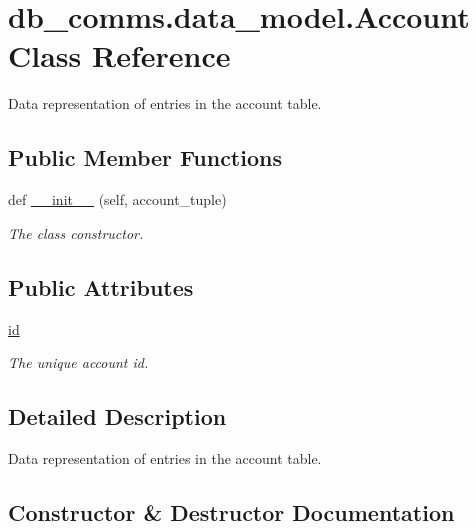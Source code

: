 \hypertarget{classdb__comms_1_1data__model_1_1_account}{}\section{db\+\_\+comms.\+data\+\_\+model.\+Account Class Reference}
\label{classdb__comms_1_1data__model_1_1_account}


Data representation of entries in the account table.  


\subsection*{Public Member Functions}
\begin{DoxyCompactItemize}
\item 
def \hyperlink{classdb__comms_1_1data__model_1_1_account_a88796d19e1a6dad4f41867b6e02b3d8f}{\+\_\+\+\_\+init\+\_\+\+\_\+} (self, account\+\_\+tuple)
\begin{DoxyCompactList}\small\item\em The class constructor. \end{DoxyCompactList}\end{DoxyCompactItemize}
\subsection*{Public Attributes}
\begin{DoxyCompactItemize}
\item 
\hyperlink{classdb__comms_1_1data__model_1_1_account_a37ba55b07a64536efe9bf4283b90da92}{id}
\begin{DoxyCompactList}\small\item\em The unique account id. \end{DoxyCompactList}\end{DoxyCompactItemize}


\subsection{Detailed Description}
Data representation of entries in the account table. 



\subsection{Constructor \& Destructor Documentation}
\hypertarget{classdb__comms_1_1data__model_1_1_account_a88796d19e1a6dad4f41867b6e02b3d8f}{}
